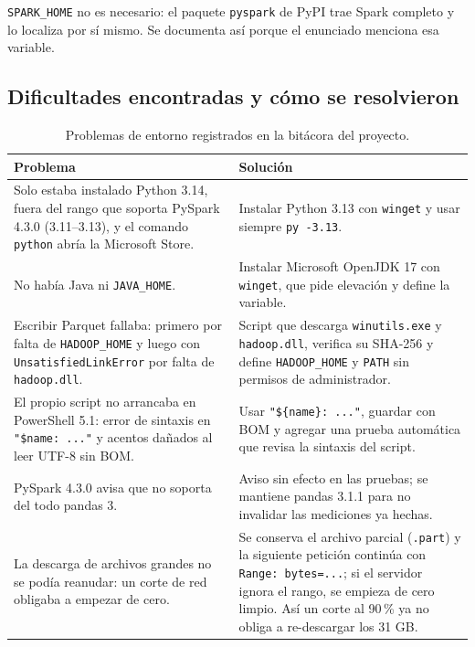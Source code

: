 \documentclass[11pt,a4paper]{article}
\begin{document}
\texttt{SPARK\_HOME} no es necesario: el paquete \texttt{pyspark} de PyPI trae Spark
completo y lo localiza por sí mismo. Se documenta así porque el enunciado menciona esa
variable.

\subsection{Dificultades encontradas y cómo se resolvieron}

\begin{table}[H]
\centering
\small
\caption{Problemas de entorno registrados en la bitácora del proyecto.}
\label{tab:dificultades}
\begin{tabularx}{\textwidth}{XX}
\toprule
Problema & Solución \\
\midrule
Solo estaba instalado Python 3.14, fuera del rango que soporta PySpark 4.3.0 (3.11--3.13), y el comando \texttt{python} abría la Microsoft Store. &
Instalar Python 3.13 con \texttt{winget} y usar siempre \texttt{py -3.13}. \\
No había Java ni \texttt{JAVA\_HOME}. &
Instalar Microsoft OpenJDK 17 con \texttt{winget}, que pide elevación y define la variable. \\
Escribir Parquet fallaba: primero por falta de \texttt{HADOOP\_HOME} y luego con \texttt{UnsatisfiedLinkError} por falta de \texttt{hadoop.dll}. &
Script que descarga \texttt{winutils.exe} y \texttt{hadoop.dll}, verifica su SHA-256 y define \texttt{HADOOP\_HOME} y \texttt{PATH} sin permisos de administrador. \\
El propio script no arrancaba en PowerShell 5.1: error de sintaxis en \texttt{"\$name: ..."} y acentos dañados al leer UTF-8 sin BOM. &
Usar \texttt{"\$\{name\}: ..."}, guardar con BOM y agregar una prueba automática que revisa la sintaxis del script. \\
PySpark 4.3.0 avisa que no soporta del todo pandas 3. &
Aviso sin efecto en las pruebas; se mantiene pandas 3.1.1 para no invalidar las mediciones ya hechas. \\
La descarga de archivos grandes no se podía reanudar: un corte de red obligaba a empezar de cero. &
Se conserva el archivo parcial (\texttt{.part}) y la siguiente petición continúa con
\texttt{Range: bytes=...}; si el servidor ignora el rango, se empieza de cero limpio. Así un
corte al 90\,\% ya no obliga a re-descargar los 31 GB. \\
\bottomrule
\end{tabularx}
\end{table}
\end{document}
